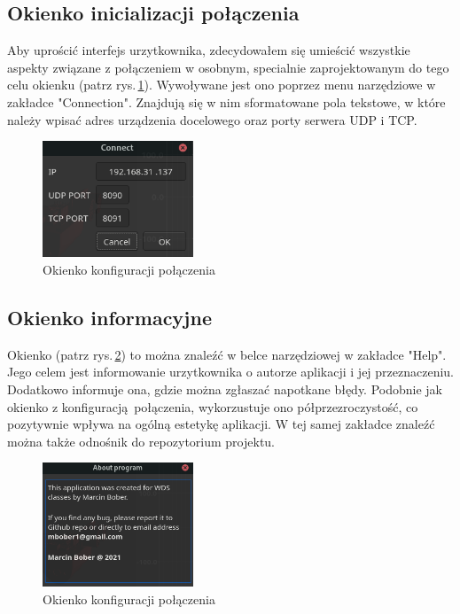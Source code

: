 \documentclass[12pt,a4paper,polish]{article}
\begin{document}
  \subsection{Okienko inicializacji połączenia}
  Aby uprościć interfejs urzytkownika, zdecydowałem się umieścić wszystkie aspekty
  związane z połączeniem w osobnym, specialnie zaprojektowanym do tego celu okienku  (patrz rys.\,\ref{fig:conn}).
  Wywoływane jest ono poprzez menu narzędziowe w zakładce "Connection".
  Znajdują się w nim sformatowane pola tekstowe, w które należy wpisać adres urządzenia
  docelowego oraz porty serwera UDP i TCP.  

  \begin{figure}[h]
    \centering
    \includegraphics[width=0.4\textwidth]{img/final/conn.png}
    \caption{Okienko konfiguracji połączenia}
    \label{fig:conn}
  \end{figure}



  \subsection{Okienko informacyjne}
  Okienko (patrz rys.\,\ref{fig:info}) to można znaleźć w belce narzędziowej w zakładce "Help". 
  Jego celem jest informowanie urzytkownika o autorze aplikacji i
  jej przeznaczeniu. Dodatkowo informuje ona, gdzie można zgłaszać
  napotkane błędy. Podobnie jak okienko z konfiguracją połączenia, 
  wykorzustuje ono półprzezroczystość, co pozytywnie wpływa na ogólną
  estetykę aplikacji. W tej samej zakładce znaleźć można także odnośnik
  do repozytorium projektu.

  \begin{figure}[h]
    \centering
    \includegraphics[width=0.4\textwidth]{img/final/info.png}
    \caption{Okienko konfiguracji połączenia}
    \label{fig:info}
  \end{figure}
\end{document}
